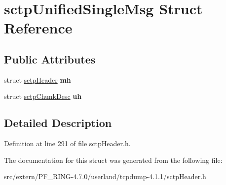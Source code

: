 \hypertarget{structsctp_unified_single_msg}{
\section{sctpUnifiedSingleMsg Struct Reference}
\label{structsctp_unified_single_msg}
}
\subsection*{Public Attributes}
\begin{DoxyCompactItemize}
\item 
\hypertarget{structsctp_unified_single_msg_a6d71162d22946f631c1b3fd5b35c757f}{
struct \hyperlink{structsctp_header}{sctpHeader} {\bfseries mh}}
\label{structsctp_unified_single_msg_a6d71162d22946f631c1b3fd5b35c757f}

\item 
\hypertarget{structsctp_unified_single_msg_aba609087f330f53e0b47366cf3e5a992}{
struct \hyperlink{structsctp_chunk_desc}{sctpChunkDesc} {\bfseries uh}}
\label{structsctp_unified_single_msg_aba609087f330f53e0b47366cf3e5a992}

\end{DoxyCompactItemize}


\subsection{Detailed Description}


Definition at line 291 of file sctpHeader.h.



The documentation for this struct was generated from the following file:\begin{DoxyCompactItemize}
\item 
src/extern/PF\_\-RING-\/4.7.0/userland/tcpdump-\/4.1.1/sctpHeader.h\end{DoxyCompactItemize}
